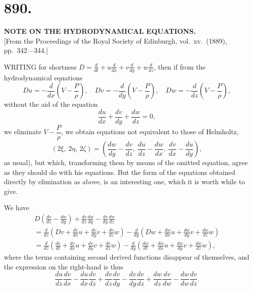 \documentclass[11pt,a4paper]{article}
\begin{document}
\section*{890.}
\begin{center}
{\large\bfseries NOTE ON THE HYDRODYNAMICAL EQUATIONS.}\\[0.5em]
\small [From the Proceedings of the Royal Society of Edinburgh, vol.\ xv.\ (1889), pp.\ 342---344.]
\end{center}

WRITING for shortness $\displaystyle D = \frac{d}{dt} + u\frac{d}{dx} + v\frac{d}{dy} + w\frac{d}{dz}$, then if from the hydrodynamical equations
\[
Du = -\frac{d}{dx}\left(V - \frac{P}{\rho}\right),\quad Dv = -\frac{d}{dy}\left(V - \frac{P}{\rho}\right),\quad Dw = -\frac{d}{dz}\left(V - \frac{P}{\rho}\right),
\]
without the aid of the equation
\[
\frac{du}{dx} + \frac{dv}{dy} + \frac{dw}{dz} = 0,
\]
we eliminate $V - \dfrac{P}{\rho}$, we obtain equations not equivalent to those of Helmholtz,
\[
(2\xi,\ 2\eta,\ 2\zeta) = \left(\frac{dw}{dy} - \frac{dv}{dz},\ \frac{du}{dz} - \frac{dw}{dx},\ \frac{dv}{dx} - \frac{du}{dy}\right),
\]
as usual), but which, transforming them by means of the omitted equation, agree as they should do with his equations. But the form of the equations obtained directly by elimination as above, is an interesting one, which it is worth while to give.

We have
\begin{multline*}
D\left(\frac{dv}{dz} - \frac{dw}{dy}\right) + \frac{dv}{dz}\frac{dw}{dy} - \frac{dv}{dy}\frac{dw}{dz} \\
= \frac{d}{dz}\left(Dv + \frac{dv}{dx}u + \frac{dv}{dy}v + \frac{dv}{dz}w\right) - \frac{d}{dy}\left(Dw + \frac{dw}{dx}u + \frac{dw}{dy}v + \frac{dw}{dz}w\right) \\
= \frac{d}{dz}\left(\frac{dv}{dt} + \frac{dv}{dx}u + \frac{dv}{dy}v + \frac{dv}{dz}w\right) - \frac{d}{dy}\left(\frac{dw}{dt} + \frac{dw}{dx}u + \frac{dw}{dy}v + \frac{dw}{dz}w\right),
\end{multline*}
where the terms containing second derived functions disappear of themselves, and the expression on the right-hand is thus
\[
\frac{du}{dz}\frac{dv}{dx} - \frac{du}{dx}\frac{dv}{dz} + \frac{dv}{dz}\frac{dv}{dy} - \frac{dv}{dy}\frac{dv}{dz} + \frac{dw}{dz}\frac{dv}{dw} - \frac{dw}{dw}\frac{dv}{dz}.
\]
\end{document}
